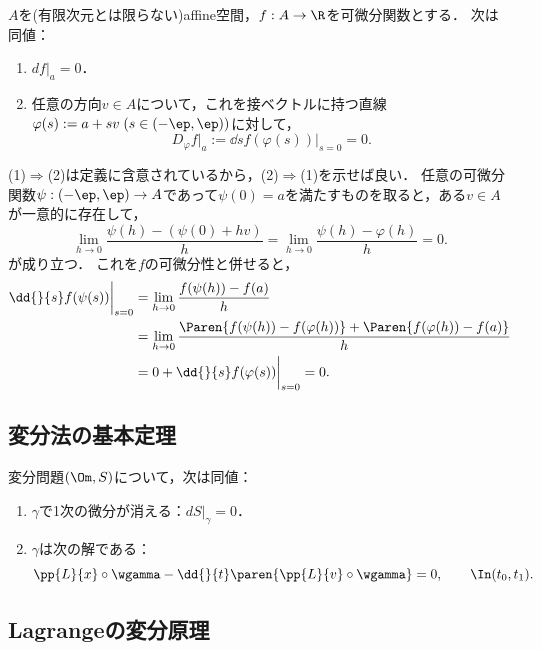 \documentclass[uplatex,dvipdfmx]{jsreport}
\begin{document}
\begin{problem}[affine空間上でFrechet微分が消えることの特徴付け]
    $A$を(有限次元とは限らない)affine空間，$f:A\to\R$を可微分関数とする．
    次は同値：
    \begin{enumerate}
        \item $df|_a=0$．
        \item 任意の方向$v\in A$について，これを接ベクトルに持つ直線$\varphi(s):=a+sv\;(s\in(-\ep,\ep))$に対して，
        \[D_\varphi f|_a:=\dd{}{s}f(\varphi(s))\biggr|_{s=0}=0.\]
    \end{enumerate}
\end{problem}
\begin{Proof}
    (1)$\Rightarrow$(2)は定義に含意されているから，(2)$\Rightarrow$(1)を示せば良い．
    任意の可微分関数$\psi:(-\ep,\ep)\to A$であって$\psi(0)=a$を満たすものを取ると，ある$v\in A$が一意的に存在して，
    \[\lim_{h\to0}\frac{\psi(h)-(\psi(0)+hv)}{h}=\lim_{h\to0}\frac{\psi(h)-\varphi(h)}{h}=0.\]
    が成り立つ．
    これを$f$の可微分性と併せると，
    \begin{align*}
        \dd{}{s}f(\psi(s))\biggr|_{s=0}&=\lim_{h\to0}\frac{f(\psi(h))-f(a)}{h}\\
        &=\lim_{h\to0}\frac{\Paren{f(\psi(h))-f(\varphi(h))}+\Paren{f(\varphi(h))-f(a)}}{h}\\
        &=0+\dd{}{s}f(\varphi(s))\biggr|_{s=0}=0.
    \end{align*}
\end{Proof}

\subsection{変分法の基本定理}

\begin{theorem}
    変分問題$(\Om,S)$について，次は同値：
    \begin{enumerate}
        \item $\gamma$で1次の微分が消える：$dS|_{\gamma}=0$．
        \item $\gamma$は次の解である：
        \[\pp{L}{x}\circ\wgamma-\dd{}{t}\paren{\pp{L}{v}\circ\wgamma}=0,\qquad\In(t_0,t_1).\]
    \end{enumerate}
\end{theorem}

\subsection{Lagrangeの変分原理}
\end{document}
